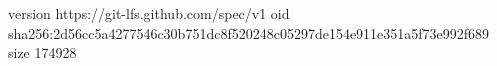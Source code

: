 version https://git-lfs.github.com/spec/v1
oid sha256:2d56cc5a4277546c30b751dc8f520248c05297de154e911e351a5f73e992f689
size 174928
